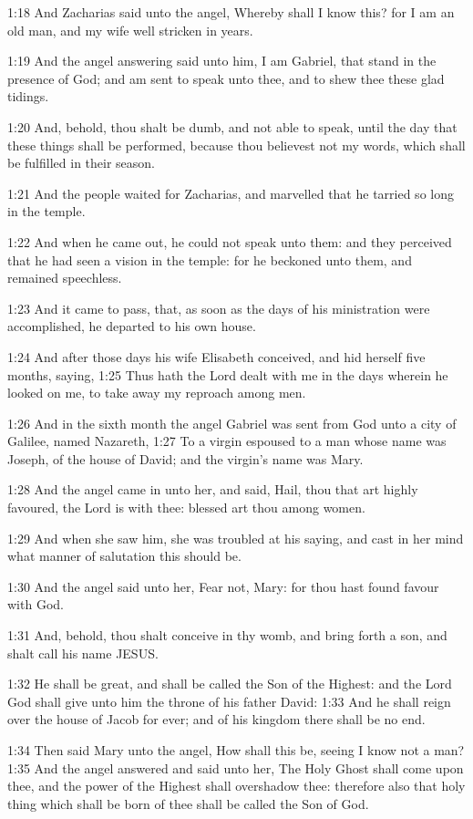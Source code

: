 1:18 And Zacharias said unto the angel, Whereby shall I know this? for
I am an old man, and my wife well stricken in years.

1:19 And the angel answering said unto him, I am Gabriel, that stand
in the presence of God; and am sent to speak unto thee, and to shew
thee these glad tidings.

1:20 And, behold, thou shalt be dumb, and not able to speak, until the
day that these things shall be performed, because thou believest not
my words, which shall be fulfilled in their season.

1:21 And the people waited for Zacharias, and marvelled that he
tarried so long in the temple.

1:22 And when he came out, he could not speak unto them: and they
perceived that he had seen a vision in the temple: for he beckoned
unto them, and remained speechless.

1:23 And it came to pass, that, as soon as the days of his
ministration were accomplished, he departed to his own house.

1:24 And after those days his wife Elisabeth conceived, and hid
herself five months, saying, 1:25 Thus hath the Lord dealt with me in
the days wherein he looked on me, to take away my reproach among men.

1:26 And in the sixth month the angel Gabriel was sent from God unto a
city of Galilee, named Nazareth, 1:27 To a virgin espoused to a man
whose name was Joseph, of the house of David; and the virgin's name
was Mary.

1:28 And the angel came in unto her, and said, Hail, thou that art
highly favoured, the Lord is with thee: blessed art thou among women.

1:29 And when she saw him, she was troubled at his saying, and cast in
her mind what manner of salutation this should be.

1:30 And the angel said unto her, Fear not, Mary: for thou hast found
favour with God.

1:31 And, behold, thou shalt conceive in thy womb, and bring forth a
son, and shalt call his name JESUS.

1:32 He shall be great, and shall be called the Son of the Highest:
and the Lord God shall give unto him the throne of his father David:
1:33 And he shall reign over the house of Jacob for ever; and of his
kingdom there shall be no end.

1:34 Then said Mary unto the angel, How shall this be, seeing I know
not a man?  1:35 And the angel answered and said unto her, The Holy
Ghost shall come upon thee, and the power of the Highest shall
overshadow thee: therefore also that holy thing which shall be born of
thee shall be called the Son of God.

